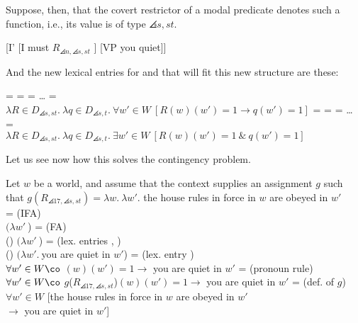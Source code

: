 Suppose, then, that the covert restrictor of a modal predicate denotes
such a function, i.e., its value is of type $\angles{s,st}$.

\ex \label{newnewlf} [I' [I must $R_{\angles{n,\angles{s,st}}}$ ] [VP you
quiet]] \xe

And the new lexical entries for  and 
that will fit this new structure are these:

\pex \a {} =  =  = \dots{} =\\
$\lambda R\in D_{\angles{s,st}}.\ \lambda q\in D_{\angles{s,t}}.\ \forall w'\in W\ [R(w)(w') =1 \rightarrow q(w')=1]$
\a {} =  =  = \dots{} =\\
$\lambda R\in D_{\angles{s,st}}.\ \lambda q\in D_{\angles{s,t}}.\ \exists w'\in
W\ [R(w)(w')=1\ \&\ q(w')=1]$ \xe

Let us see now how this solves the contingency problem.

\ex Let $w$ be a world, and assume that the context supplies an assignment $g$ such that $g(R_{\angles{17,\angles{s,st}}}) = \lambda w.\ \lambda w'.$ the house rules in force in $w$ are obeyed in $w'$\\[9pt]
 = \hfill{\tiny (IFA)}\\
$(\lambda w'\ $) = \hfill{\tiny (FA)}\\
 () $(\lambda w'\ $) = \hfill{\tiny (lex. entries , )}\\
 () $(\lambda w'.\ $you are quiet in $w'$) = \hfill{\tiny (lex. entry )}\\
$\forall w'\in W\co$ $(w)(w') =1 \rightarrow $ you are quiet in $w'$ = \hfill{\tiny (pronoun rule)}\\
$\forall w'\in W\co$ $g$({$R_{\angles{17,\angles{s,st}}}$})$(w)(w') =1 \rightarrow $ you are quiet in $w'$ = \hfill{\tiny (def. of $g$)}\\
$\forall w'\in W$ [the house rules in force in $w$ are obeyed in $w'$ \\
\null\hfill $\rightarrow$ you are quiet in $w'$] \xe

